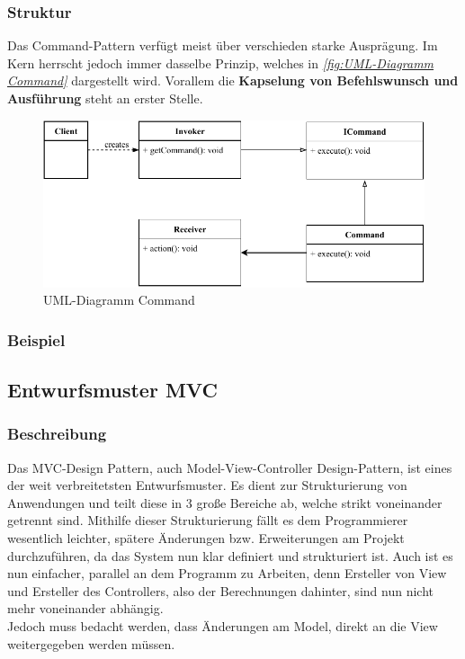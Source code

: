 \subsubsection{Struktur}
Das Command-Pattern verfügt meist über verschieden starke Ausprägung.
Im Kern herrscht jedoch immer dasselbe Prinzip, welches in \textit{\autoref{fig:UML-Diagramm Command}} dargestellt wird.
Vorallem die \textbf{Kapselung von Befehlswunsch und Ausführung} steht an erster Stelle.
\begin{figure}[H]
    \centering
    \includegraphics[width=1\textwidth]{fig/ainf/Command.pdf}
    \caption{UML-Diagramm Command}
    \label{fig:UML-Diagramm Command}
\end{figure}
\subsubsection{Beispiel}
\subsection{Entwurfsmuster MVC}\label{subsec:entwurfsmuster-mvc}
\subsubsection{Beschreibung}
Das MVC-Design Pattern, auch Model-View-Controller Design-Pattern, ist eines der weit verbreitetsten Entwurfsmuster.
Es dient zur Strukturierung von Anwendungen und teilt diese in 3 große Bereiche ab, welche strikt voneinander getrennt sind.
Mithilfe dieser Strukturierung fällt es dem Programmierer wesentlich leichter, spätere Änderungen bzw. Erweiterungen am Projekt durchzuführen, da das System nun klar definiert und strukturiert ist.
Auch ist es nun einfacher, parallel an dem Programm zu Arbeiten, denn Ersteller von View und Ersteller des Controllers, also der Berechnungen dahinter, sind nun nicht mehr voneinander abhängig.\\
Jedoch muss bedacht werden, dass Änderungen am Model, direkt an die View weitergegeben werden müssen.
